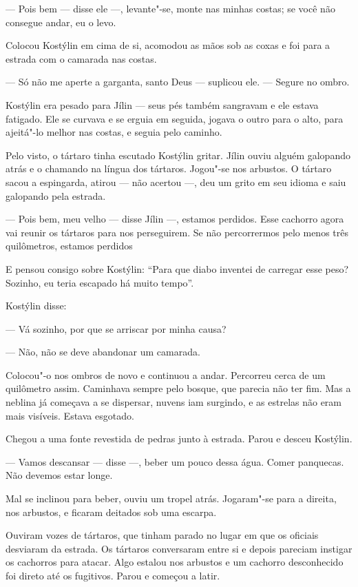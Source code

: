 --- Pois bem --- disse ele ---, levante"-se, monte nas minhas costas; se
você não consegue andar, eu o levo.

Colocou Kostýlin em cima de si, acomodou as mãos sob as coxas e foi para
a estrada com o camarada nas costas.

--- Só não me aperte a garganta, santo Deus --- suplicou ele. --- Segure
no ombro.

Kostýlin era pesado para Jílin --- seus pés também sangravam e ele
estava fatigado. Ele se curvava e se erguia em seguida, jogava o outro
para o alto, para ajeitá"-lo melhor nas costas, e seguia pelo caminho.

Pelo visto, o tártaro tinha escutado Kostýlin gritar. Jílin ouviu alguém
galopando atrás e o chamando na língua dos tártaros. Jogou"-se nos
arbustos. O tártaro sacou a espingarda, atirou --- não acertou ---, deu
um grito em seu idioma e saiu galopando pela estrada.

--- Pois bem, meu velho --- disse Jílin ---, estamos perdidos. Esse
cachorro agora vai reunir os tártaros para nos perseguirem. Se não
percorrermos pelo menos três quilômetros, estamos perdidos

E pensou consigo sobre Kostýlin: ``Para que diabo inventei de carregar
esse peso? Sozinho, eu teria escapado há muito tempo''.

Kostýlin disse:

--- Vá sozinho, por que se arriscar por minha causa?

--- Não, não se deve abandonar um camarada.

Colocou"-o nos ombros de novo e continuou a andar. Percorreu cerca de um
quilômetro assim. Caminhava sempre pelo bosque, que parecia não ter fim.
Mas a neblina já começava a se dispersar, nuvens iam surgindo, e as
estrelas não eram mais visíveis. Estava esgotado.

Chegou a uma fonte revestida de pedras junto à estrada. Parou e desceu
Kostýlin.

--- Vamos descansar --- disse ---, beber um pouco dessa água. Comer
panquecas. Não devemos estar longe.

Mal se inclinou para beber, ouviu um tropel atrás. Jogaram"-se para a
direita, nos arbustos, e ficaram deitados sob uma escarpa.

Ouviram vozes de tártaros, que tinham parado no lugar em que os oficiais
desviaram da estrada. Os tártaros conversaram entre si e depois pareciam
instigar os cachorros para atacar. Algo estalou nos arbustos e um
cachorro desconhecido foi direto até os fugitivos. Parou e começou a
latir.

